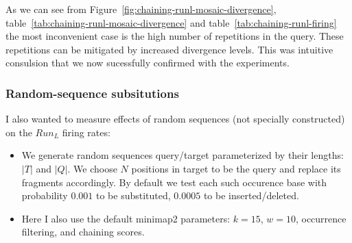 As we can see from Figure~\ref{fig:chaining-runl-mosaic-divergence}, table~\ref{tab:chaining-runl-mosaic-divergence} and table~\ref{tab:chaining-runl-firing} the most inconvenient case is the high number of repetitions in the query. These repetitions can be mitigated by increased divergence levels. This was intuitive consulsion that we now sucessfully confirmed with the experiments.

\subsubsection{Random-sequence subsitutions}

I also wanted to measure effects of random sequences (not specially constructed) on the $Run_L$ firing rates:
\begin{itemize}
  \item We generate random sequences query/target parameterized by their lengths: $|T|$ and $|Q|$. We choose $N$ positions in target to be the query and replace its fragments accordingly. By default we test each such occurence base with probability $0.001$ to be substituted, $0.0005$ to be inserted/deleted.
  \item Here I also use the default minimap2 parameters: $k=15$, $w=10$, occurrence filtering, and chaining scores.
\end{itemize}

